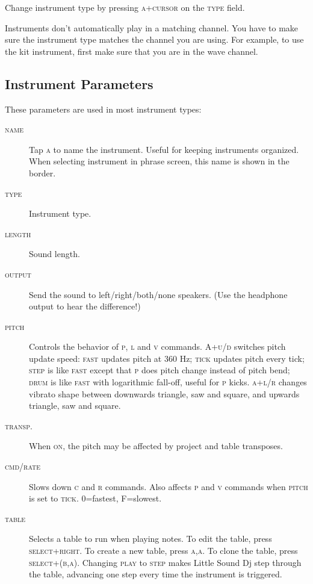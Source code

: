 Change instrument type by pressing \textsc{a+cursor} on the \textsc{type} field.

Instruments don't automatically play in a matching channel. You have to make sure the instrument type matches the channel you are using. For example, to use the kit instrument, first make sure that you are in the wave channel.

\subsection{Instrument Parameters}
\label{general-instrument-parameters}

These parameters are used in most instrument types:

\begin{description}
	\item[\textsc{name}] Tap \textsc{a} to name the instrument. Useful for keeping instruments organized. When selecting instrument in phrase screen, this name is shown in the border.
	\item[\textsc{type}] Instrument type.
	\item[\textsc{length}] Sound length.
	\item[\textsc{output}] Send the sound to left/right/both/none speakers. (Use the headphone output to hear the difference!)
    \item[\textsc{pitch}] Controls the behavior of \textsc{p}, \textsc{l} and \textsc{v} commands. \textsc{A+u/d} switches pitch update speed: \textsc{fast} updates pitch at 360 Hz; \textsc{tick} updates pitch every tick; \textsc{step} is like \textsc{fast} except that \textsc{p} does pitch change instead of pitch bend; \textsc{drum} is like \textsc{fast} with logarithmic fall-off, useful for \textsc{p} kicks. \textsc{a+l/r} changes vibrato shape between downwards triangle, saw and square, and upwards triangle, saw and square.
    \item[\textsc{transp.}] When \textsc{on}, the pitch may be affected by project and table transposes.
    \item[\textsc{cmd/rate}] Slows down \textsc{c} and \textsc{r} commands.
        Also affects \textsc{p} and \textsc{v} commands when \textsc{pitch} is set to \textsc{tick}.
        0=fastest, F=slowest.
    \item[\textsc{table}] Selects a table to run when playing notes. To edit the table, press \textsc{select+right}. To create a new table, press \textsc{a,a}. To clone the table, press \textsc{select+(b,a)}.
        Changing \textsc{play} to \textsc{step} makes Little Sound Dj step through the table, advancing one step every time the instrument is triggered.
\end{description}

